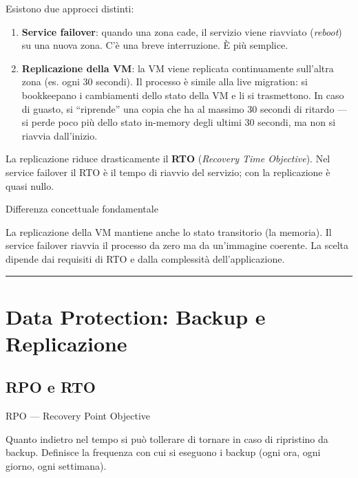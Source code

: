 \documentclass[
  italian,
  openany]{book}
\begin{document}
Esistono due approcci distinti:

\begin{enumerate}
\def\labelenumi{\arabic{enumi}.}
\item
  \textbf{Service failover}: quando una zona cade, il servizio viene
  riavviato (\emph{reboot}) su una nuova zona. C'è una breve
  interruzione. È più semplice.
\item
  \textbf{Replicazione della VM}: la VM viene replicata continuamente
  sull'altra zona (es. ogni 30 secondi). Il processo è simile alla live
  migration: si bookkeepano i cambiamenti dello stato della VM e li si
  trasmettono. In caso di guasto, si ``riprende'' una copia che ha al
  massimo 30 secondi di ritardo --- si perde poco più dello stato
  in-memory degli ultimi 30 secondi, ma non si riavvia dall'inizio.
\end{enumerate}

La replicazione riduce drasticamente il \textbf{RTO} (\emph{Recovery
Time Objective}). Nel service failover il RTO è il tempo di riavvio del
servizio; con la replicazione è quasi nullo.

\begin{callouttip}{Differenza concettuale fondamentale}

La replicazione della VM mantiene anche lo stato transitorio (la
memoria). Il service failover riavvia il processo da zero ma da
un'immagine coerente. La scelta dipende dai requisiti di RTO e dalla
complessità dell'applicazione.

\end{callouttip}

\begin{center}\rule{0.5\linewidth}{0.5pt}\end{center}

\section{Data Protection: Backup e
Replicazione}\label{data-protection-backup-e-replicazione}

\subsection{RPO e RTO}\label{rpo-e-rto-1}

\begin{calloutdefinition}{RPO — Recovery Point Objective}

Quanto indietro nel tempo si può tollerare di tornare in caso di
ripristino da backup. Definisce la frequenza con cui si eseguono i
backup (ogni ora, ogni giorno, ogni settimana).

\end{calloutdefinition}
\end{document}
